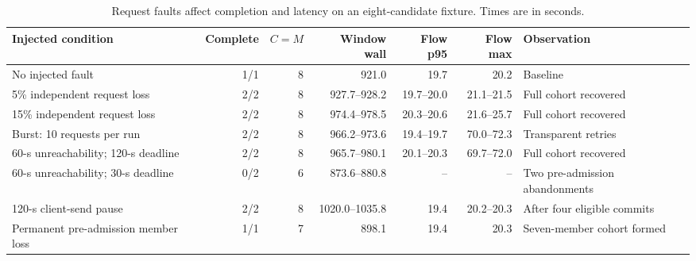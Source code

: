 \begin{table}[t]
\centering
\caption{Request faults affect completion and latency on an eight-candidate fixture. Times are in seconds.}
\label{tab:availability-matrix}
\footnotesize
\begin{tabularx}{\textwidth}{@{}YrrrrrY@{}}
\toprule
Injected condition & Complete & \(C=M\) & Window wall & Flow p95 & Flow max & Observation \\
\midrule
No injected fault & 1/1 & 8 & 921.0 & 19.7 & 20.2 & Baseline \\
5\% independent request loss & 2/2 & 8 & 927.7--928.2 & 19.7--20.0 & 21.1--21.5 & Full cohort recovered \\
15\% independent request loss & 2/2 & 8 & 974.4--978.5 & 20.3--20.6 & 21.6--25.7 & Full cohort recovered \\
Burst: 10 requests per run & 2/2 & 8 & 966.2--973.6 & 19.4--19.7 & 70.0--72.3 & Transparent retries \\
60-s unreachability; 120-s deadline & 2/2 & 8 & 965.7--980.1 & 20.1--20.3 & 69.7--72.0 & Full cohort recovered \\
60-s unreachability; 30-s deadline & 0/2 & 6 & 873.6--880.8 & -- & -- & Two pre-admission abandonments \\
120-s client-send pause & 2/2 & 8 & 1020.0--1035.8 & 19.4 & 20.2--20.3 & After four eligible commits \\
Permanent pre-admission member loss & 1/1 & 7 & 898.1 & 19.4 & 20.3 & Seven-member cohort formed \\
\bottomrule
\end{tabularx}
\end{table}
